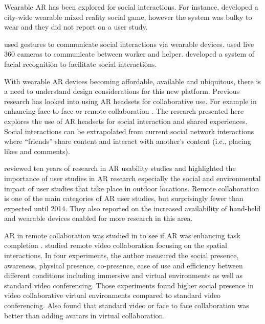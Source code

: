 Wearable AR has been explored for social interactions. For instance, \textcite{Cheok2002a} developed a city-wide wearable mixed reality social game, however the system was bulky to wear and they did not report on a user study. 

\textcite{Amores2015} used gestures to communicate social interactions via wearable devices. \textcite{Lee2019} used live 360 cameras to communicate between worker and helper. \textcite{Shu2018} developed a system of facial recognition to facilitate social interactions. 

With wearable AR devices becoming affordable, available and ubiquitous, there is a need to understand design considerations for this new platform. Previous research has looked into using AR headsets for collaborative use. For example in enhancing face-to-face \cite{Billinghurst2002} or remote collaboration \cite{Gupta2016}. The research presented here explores the use of AR headsets for social interaction and shared experiences. Social interactions can be extrapolated from current social network interactions where \enquote{friends} share content and interact with another's content (i.e., placing likes and comments).

\textcite{Dey2018} reviewed ten years of research in AR usability studies and highlighted the importance of user studies in AR research especially the social and environmental impact of user studies that take place in outdoor locations. Remote collaboration is one of the main categories of AR user studies, but surprisingly fewer than expected until 2014. They also reported on the increased availability of hand-held and wearable devices enabled for more research in this area. 

AR in remote collaboration was studied in to see if AR was enhancing task completion \cite{Kim2014, Tversky2015, Gupta2016, Kim2015}.
\textcite{hauber2008understanding} studied remote video collaboration focusing on the spatial interactions. In four experiments, the author measured the social presence, awareness, physical presence, co-presence, ease of use and efficiency between different conditions including immersive and virtual environments as well as standard video conferencing. Those experiments found higher social presence in video collaborative virtual environments compared to standard video conferencing. Also found that standard video or face to face collaboration was better than adding avatars in virtual collaboration.


